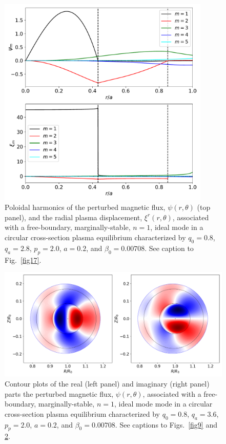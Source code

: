 \documentclass[12pt,prb,aps]{revtex4-1}
\begin{document}
\begin{figure}
\centerline{\includegraphics[width=0.9\textwidth]{Fig20.pdf}}
\caption{Poloidal harmonics of the perturbed magnetic flux, $\psi(r,\theta)$ (top panel), and the radial plasma displacement, $\xi^r(r,\theta)$,  associated with a free-boundary,
marginally-stable, $n=1$, ideal mode in a 
circular cross-section plasma equilibrium characterized by $q_0=0.8$, $q_a= 2.8$, $p_p=2.0$, 
$a=0.2$, and $\beta_0=0.00708$. See caption to Fig.~\ref{fig17}.\label{fig20}}
\end{figure}

\begin{figure}
\centerline{\includegraphics[width=\textwidth]{Fig21.png}}
\caption{Contour plots of the real (left panel) and imaginary (right panel) parts the perturbed magnetic flux, $\psi(r,\theta)$, associated with a free-boundary, marginally-stable, $n=1$,
ideal mode mode  in a 
circular cross-section plasma equilibrium characterized by $q_0=0.8$, $q_a= 3.6$, $p_p=2.0$, 
$a=0.2$, and $\beta_0=0.00708$. See captions to Figs.~\ref{fig9} and \ref{fig21}. \label{fig21}}
\end{figure}
\end{document}

